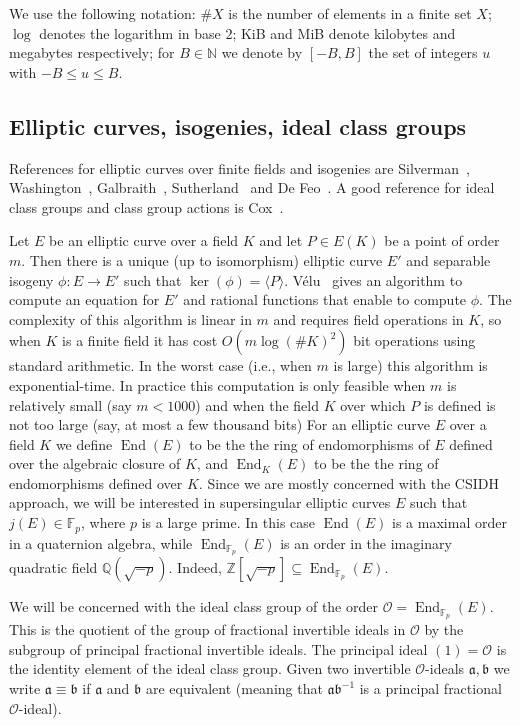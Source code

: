 \documentclass{llncs}
\newcommand{\F}{\mathbb{F}}
\newcommand{\N}{\mathbb{N}}
\newcommand{\OO}{\mathcal{O}}
\newcommand{\Q}{\mathbb{Q}}
\newcommand{\Z}{\mathbb{Z}}
\DeclareMathOperator{\End}{End}
\renewcommand{\a}{\mathfrak{a}}
\renewcommand{\b}{\mathfrak{b}}
\begin{document}
We use the following notation: 
$\#X$ is the number of elements in a finite set $X$;
$\log$ denotes the logarithm in base $2$;
KiB and MiB denote kilobytes and megabytes respectively;
for $B \in \N$ we denote by $[-B,B]$ the set of integers $u$ with $-B \le u \le B$.


\subsection{Elliptic curves, isogenies, ideal class groups}


References for elliptic curves over finite fields and isogenies are Silverman~\cite{Sil86}, Washington~\cite{Was08}, Galbraith~\cite{Gal12}, Sutherland~\cite{Sut17} and De Feo~\cite{DF17}.
A good reference for ideal class groups and class group actions is Cox~\cite{Cox}.

Let $E$ be an elliptic curve over a field $K$ and let $P \in E( K )$ be a point of order $m$.
Then there is a unique (up to isomorphism) elliptic curve $E'$ and separable isogeny $\phi : E \to E'$ such that $\ker( \phi ) = \langle P \rangle$.
V{\' e}lu~\cite{velu71} gives an algorithm to compute an equation for $E'$ and rational functions that enable to compute $\phi$.
The complexity of this algorithm is linear in $m$ and requires field operations in $K$, so when $K$ is a finite field it has cost $O( m \log( \#K )^2 )$ bit operations using standard arithmetic.
In the worst case (i.e., when $m$ is large) this algorithm is exponential-time.
In practice this computation is only feasible when $m$ is relatively small (say $m < 1000$) and when the field $K$ over which $P$ is defined is not too large (say, at most a few thousand bits)
For an elliptic curve $E$ over a field $K$ we define $\End(E)$ to be the the ring of endomorphisms of $E$ defined over the algebraic closure of $K$, and $\End_K(E)$ to be the the ring of endomorphisms defined over $K$.
Since we are mostly concerned with the CSIDH~\cite{CLMPR18} approach, we will be interested in supersingular elliptic curves $E$ such that $j(E) \in \F_p$, where $p$ is a large prime.
In this case $\End( E )$ is a maximal order in a quaternion algebra, while $\End_{\F_p}(E)$ is an order in the imaginary quadratic field $\Q( \sqrt{-p} )$.
Indeed, $\Z[ \sqrt{-p} ] \subseteq \End_{\F_p}(E)$.

We will be concerned with the ideal class group of the order $\OO = \End_{\F_p}(E)$.
This is the quotient of the group of fractional invertible ideals in $\OO$ by the subgroup of principal fractional invertible ideals.
The principal ideal $(1) = \OO$ is the identity element of the ideal class group.
Given two invertible $\OO$-ideals $\a, \b$ we write $\a \equiv \b$ if $\a$ and $\b$ are equivalent (meaning that $\a \b^{-1}$ is a principal fractional $\OO$-ideal). 
\end{document}
